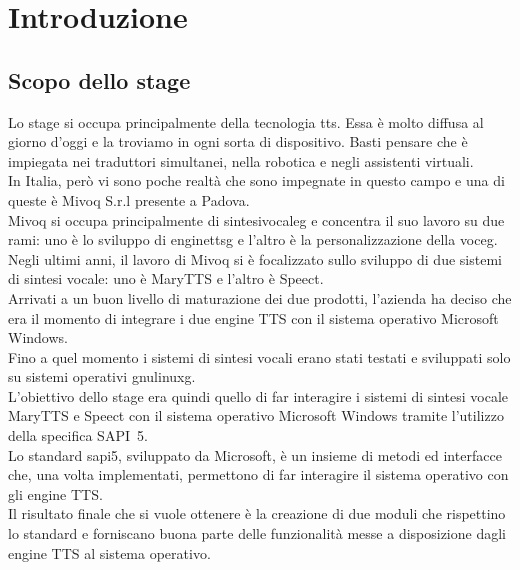 \chapter{Introduzione} %
\thispagestyle{empty}
\newpage
\section{Scopo dello stage}
Lo stage si occupa principalmente della tecnologia \gls{tts}. Essa è molto diffusa al giorno d'oggi e la troviamo in ogni sorta di dispositivo. Basti pensare che è impiegata nei traduttori simultanei, nella robotica e negli assistenti virtuali.\\ 
In Italia, però vi sono poche realtà che sono impegnate in questo campo e una di queste è Mivoq S.r.l presente a Padova.\\
Mivoq si occupa principalmente di \gls{sintesivocaleg} e concentra il suo lavoro su due rami:  uno è lo sviluppo di \gls{enginettsg} e l'altro è la personalizzazione della \gls{voceg}.\\
Negli ultimi anni, il lavoro di Mivoq si è focalizzato sullo sviluppo di due sistemi di sintesi vocale: uno è MaryTTS e l'altro è Speect.\\
Arrivati a un buon livello di maturazione dei due prodotti, l'azienda ha deciso che era il momento di integrare i due engine TTS con il sistema operativo Microsoft Windows.\\
Fino a quel momento i sistemi di sintesi vocali erano stati testati e sviluppati solo su sistemi operativi \gls{gnulinuxg}.\\
L'obiettivo dello stage era quindi quello di far interagire i sistemi di sintesi vocale MaryTTS e Speect con il sistema operativo Microsoft Windows tramite l'utilizzo della specifica SAPI~5.\\
Lo standard \gls{sapi5}, sviluppato da Microsoft, è un insieme di metodi ed interfacce che, una volta implementati, permettono di far interagire il sistema operativo con gli engine TTS.\\
Il risultato finale che si vuole ottenere è la creazione di due moduli che rispettino lo standard e forniscano buona parte delle funzionalità messe a disposizione dagli engine TTS al sistema operativo.

